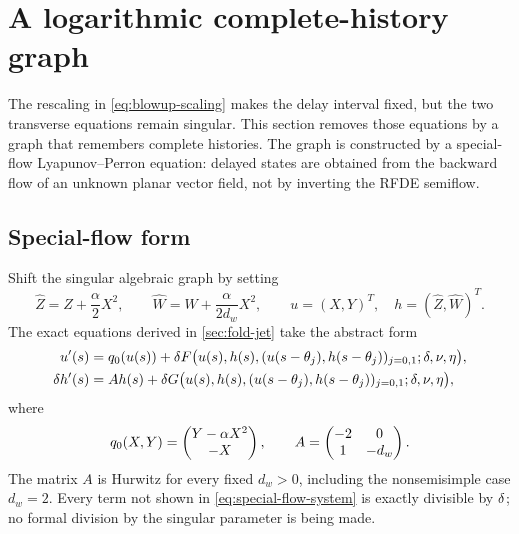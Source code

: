\section{A logarithmic complete-history graph}
\label{sec:history-graph}

The rescaling in \cref{eq:blowup-scaling} makes the delay interval fixed,
but the two transverse equations remain singular.  This section removes
those equations by a graph that remembers complete histories.  The graph is
constructed by a special-flow Lyapunov--Perron equation: delayed states are
obtained from the backward flow of an unknown planar vector field, not by
inverting the RFDE semiflow.

\subsection{Special-flow form}

Shift the singular algebraic graph by setting
\begin{equation}
\label{eq:stable-shift}
 \widehat Z=Z+\frac{\alpha}{2}X^2,
 \qquad
 \widehat W=W+\frac{\alpha}{2d_w}X^2,
 \qquad u=(X,Y)^T,\quad h=(\widehat Z,\widehat W)^T.
\end{equation}
The exact equations derived in \cref{sec:fold-jet} take the abstract form
\begin{equation}
\label{eq:special-flow-system}
\begin{aligned}
 u'(s)&=q_0(u(s))+\delta F\bigl(u(s),h(s),
             (u(s-\theta_j),h(s-\theta_j))_{j=0,1};
             \delta,\nu,\eta\bigr),\\
 \delta h'(s)&=Ah(s)+\delta G\bigl(u(s),h(s),
             (u(s-\theta_j),h(s-\theta_j))_{j=0,1};
             \delta,\nu,\eta\bigr),
\end{aligned}
\end{equation}
where
\begin{equation}
\label{eq:q0-A}
 q_0(X,Y)=\begin{pmatrix}Y-\alpha X^2\\-X\end{pmatrix},
 \qquad
 A=\begin{pmatrix}-2&0\\1&-d_w\end{pmatrix}.
\end{equation}
The matrix \(A\) is Hurwitz for every fixed \(d_w>0\), including the
nonsemisimple case \(d_w=2\).  Every term not shown in
\cref{eq:special-flow-system} is exactly divisible by \(\delta\); no formal
division by the singular parameter is being made.

